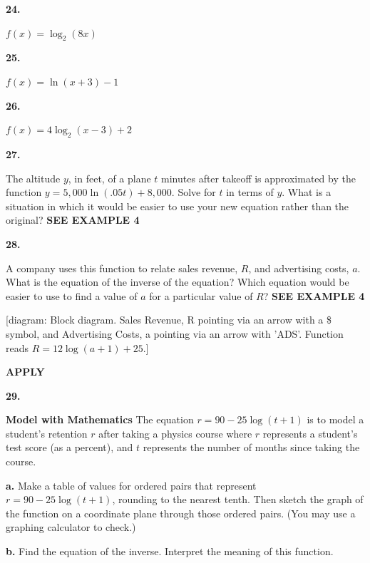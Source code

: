 \documentclass{article}
\newenvironment{practice}[2]{\textbf{#1.}\par}{\par}
\newcommand{\answer}[1]{}
\newcommand{\placeholder}[2]{[#1: #2]}
\begin{document}
\begin{practice}{24}{}
$f(x) = \log_2 (8x)$
\answer{}
\end{practice}

\begin{practice}{25}{}
$f(x) = \ln (x + 3) - 1$
\answer{}
\end{practice}

\begin{practice}{26}{}
$f(x) = 4 \log_2 (x - 3) + 2$
\answer{}
\end{practice}

\begin{practice}{27}{}
The altitude $y$, in feet, of a plane $t$ minutes after takeoff is approximated by the function $y = 5,000 \ln(.05t) + 8,000$. Solve for $t$ in terms of $y$. What is a situation in which it would be easier to use your new equation rather than the original? \textbf{SEE EXAMPLE 4}
\answer{}
\end{practice}

\begin{practice}{28}{}
A company uses this function to relate sales revenue, $R$, and advertising costs, $a$. What is the equation of the inverse of the equation? Which equation would be easier to use to find a value of $a$ for a particular value of $R$? \textbf{SEE EXAMPLE 4}

\placeholder{diagram}{Block diagram. Sales Revenue, R pointing via an arrow with a \$ symbol, and Advertising Costs, a pointing via an arrow with 'ADS'. Function reads $R = 12 \log(a + 1) + 25$.}
\answer{}
\end{practice}

\vspace{1em}
\textbf{APPLY}

\begin{practice}{29}{}
\textbf{Model with Mathematics} The equation $r = 90 - 25 \log(t + 1)$ is to model a student's retention $r$ after taking a physics course where $r$ represents a student's test score (as a percent), and $t$ represents the number of months since taking the course.

\textbf{a.} Make a table of values for ordered pairs that represent $r = 90 - 25 \log(t + 1)$, rounding to the nearest tenth. Then sketch the graph of the function on a coordinate plane through those ordered pairs. (You may use a graphing calculator to check.)

\textbf{b.} Find the equation of the inverse. Interpret the meaning of this function.
\answer{}
\end{practice}
\end{document}
